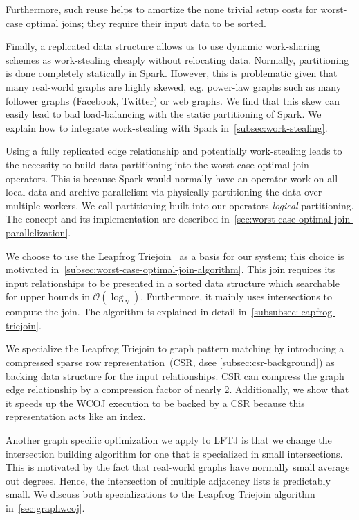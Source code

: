 Furthermore, such reuse helps to amortize the none trivial setup costs for worst-case optimal joins;
they require their input data to be sorted.

Finally, a replicated data structure allows us to use dynamic work-sharing schemes as work-stealing cheaply without relocating
data.
Normally, partitioning is done completely statically in Spark.
However, this is problematic given that many real-world graphs are highly skewed, e.g. power-law graphs such as many follower graphs
(Facebook, Twitter) or web graphs.
We find that this skew can easily lead to bad load-balancing with the static partitioning of Spark.
We explain how to integrate work-stealing with Spark in~\cref{subsec:work-stealing}.

Using a fully replicated edge relationship and potentially work-stealing leads to the necessity to build data-partitioning into
the worst-case optimal join operators.
This is because Spark would normally have an operator work on all local data and archive parallelism via physically partitioning the
data over multiple workers.
We call partitioning built into our operators \textit{logical} partitioning.
The concept and its implementation are described in~\cref{sec:worst-case-optimal-join-parallelization}.

We choose to use the Leapfrog Triejoin~\cite{lftj} as a basis for our system;
this choice is motivated in~\cref{subsec:worst-case-optimal-join-algorithm}.
This join requires its input relationships to be presented in a sorted data structure which searchable for upper bounds in
$\mathcal{O} (\log_N)$.
Furthermore, it mainly uses intersections to compute the join.
The algorithm is explained in detail in~\cref{subsubsec:leapfrog-triejoin}.

We specialize the Leapfrog Triejoin to graph pattern matching by introducing a compressed sparse row representation~(\textsc{CSR}, dsee
\cref{subsec:csr-background}) as backing data structure for the input relationships.
\textsc{CSR} can compress the graph edge relationship by a compression factor of nearly 2.
Additionally, we show that it speeds up the \textsc{WCOJ} execution to be backed by a \textsc{CSR} because this representation
acts like an index.

Another graph specific optimization we apply to \textsc{LFTJ} is that we change the intersection building algorithm for one
that is specialized in small intersections.
This is motivated by the fact that real-world graphs have normally small average out degrees.
Hence, the intersection of multiple adjacency lists is predictably small.
We discuss both specializations to the Leapfrog Triejoin algorithm in~\cref{sec:graphwcoj}.

